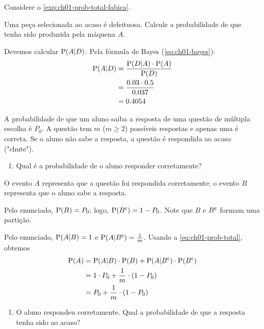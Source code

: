 \begin{example}
    Considere o \cref{exp:ch01-prob-total-fabica}.
    
    Uma peça selecionada ao acaso é defeituosa.
    Calcule a probabilidade de que tenha sido produzida pela máquena $A$.

    \bigskip
    Devemos calcular $\operatorname{P}(A | D)$. Pela fórmula de Bayes
    (\cref{eq:ch01-bayes}):
    \begin{align*}
        \operatorname{P}(A | D) &= \frac{\operatorname{P}(D | A) \cdot \operatorname{P}(A)}{\operatorname{P}(D)} \\
        &= \frac{0.03 \cdot 0.5}{0.037} \\
        &= 0.4054
    \end{align*}
\end{example}

\begin{example}
    A probabilidade de que um aluno saiba a resposta de uma questão
    de múltipla escolha é $P_0$. A questão tem $m$ ($m \geq 2$)
    possíveis respostas e apenas uma é correta. Se o aluno não sabe 
    a resposta, a questão é respondida ao acaso ("chute").
    
    \bigskip
    \begin{enumerate}[label=(\alph*)]
        \item Qual é a probabilidade de o aluno responder corretamente?
    \end{enumerate}

    O evento $A$ representa que a questão foi respondida corretamente;
    o evento $B$ representa que o aluno sabe a resposta.

    Pelo enunciado, $\operatorname{P}(B) = P_0$; logo, $\operatorname{P}({B}^{\mathsf{c}}) = 1 - P_0$.
    Note que $B$ e ${B}^{\mathsf{c}}$ formam uma partição.

    Pelo enunciado, $\operatorname{P}(A | B) = 1$ e $\operatorname{P}(A | {B}^{\mathsf{c}}) = \frac{1}{m}$.
    Usando a \cref{eq:ch01-prob-total}, obtemos
    \begin{align*}
        \operatorname{P}(A) &=
            \operatorname{P}(A | B) \cdot \operatorname{P}(B) 
            + \operatorname{P}(A | {B}^{\mathsf{c}}) \cdot \operatorname{P}({B}^{\mathsf{c}}) \\
        &= 1 \cdot P_0
            + \frac{1}{m} \cdot (1 - P_0) \\
        &= P_0 + \frac{1}{m} \cdot (1 - P_0)
    \end{align*}

    \bigskip
    \begin{enumerate}[label=(\alph*), resume]
        \item O aluno respondeu corretamente.
        Qual a probabilidade de que a resposta tenha sido ao acaso?
    \end{enumerate}


\end{example}
